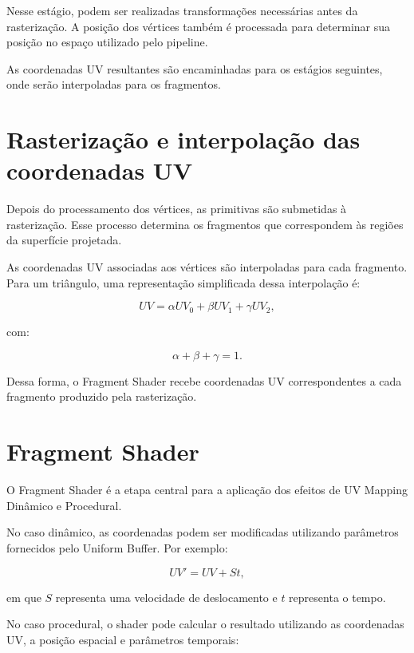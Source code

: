 Nesse estágio, podem ser realizadas transformações necessárias antes da
rasterização. A posição dos vértices também é processada para determinar sua
posição no espaço utilizado pelo pipeline.

As coordenadas UV resultantes são encaminhadas para os estágios seguintes,
onde serão interpoladas para os fragmentos.

\section{Rasterização e interpolação das coordenadas UV}

Depois do processamento dos vértices, as primitivas são submetidas à
rasterização. Esse processo determina os fragmentos que correspondem às
regiões da superfície projetada.

As coordenadas UV associadas aos vértices são interpoladas para cada
fragmento. Para um triângulo, uma representação simplificada dessa
interpolação é:

\begin{equation}
UV = \alpha UV_0 + \beta UV_1 + \gamma UV_2,
\end{equation}

com:

\begin{equation}
\alpha+\beta+\gamma=1.
\end{equation}

Dessa forma, o Fragment Shader recebe coordenadas UV correspondentes a cada
fragmento produzido pela rasterização.

\section{Fragment Shader}

O Fragment Shader é a etapa central para a aplicação dos efeitos de
UV Mapping Dinâmico e Procedural.

No caso dinâmico, as coordenadas podem ser modificadas utilizando parâmetros
fornecidos pelo Uniform Buffer. Por exemplo:

\begin{equation}
UV' = UV + S t,
\end{equation}

em que $S$ representa uma velocidade de deslocamento e $t$ representa o
tempo.

No caso procedural, o shader pode calcular o resultado utilizando as
coordenadas UV, a posição espacial e parâmetros temporais:

